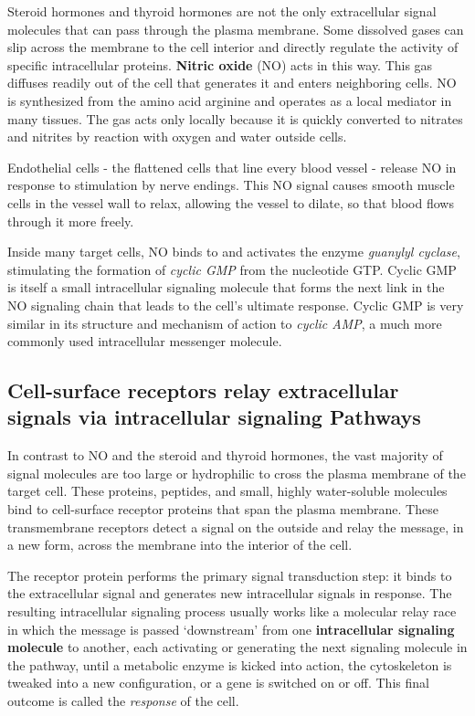Steroid hormones and thyroid hormones are not the only extracellular
signal molecules that can pass through the plasma membrane. Some
dissolved gases can slip across the membrane to the cell interior and
directly regulate the activity of specific intracellular proteins.
\textbf{Nitric oxide} (NO) acts in this way. This gas diffuses readily out of
the cell that generates it and enters neighboring cells. NO is synthesized
from the amino acid arginine and operates as a local mediator in many
tissues. The gas acts only locally because it is quickly converted to
nitrates and nitrites by reaction with oxygen and water outside cells.

Endothelial cells - the flattened cells that line every blood vessel - release
NO in response to stimulation by nerve endings. This NO signal causes
smooth muscle cells in the vessel wall to relax, allowing the vessel to
dilate, so that blood flows through it more freely.

Inside many target cells, NO binds to and activates the enzyme \textit{guanylyl
cyclase}, stimulating the formation of \textit{cyclic GMP} from the nucleotide GTP.
Cyclic GMP is itself a small intracellular signaling
molecule that forms the next link in the NO signaling chain that leads to
the cell’s ultimate response. Cyclic GMP is very similar in its structure and mechanism
of action to \textit{cyclic AMP}, a much more commonly used intracellular
messenger molecule.

\subsection{Cell-surface receptors relay extracellular signals via intracellular signaling Pathways}

In contrast to NO and the steroid and thyroid hormones, the vast majority
of signal molecules are too large or hydrophilic to cross the plasma
membrane of the target cell. These proteins, peptides, and small, highly
water-soluble molecules bind to cell-surface receptor proteins that span
the plasma membrane. These transmembrane receptors
detect a signal on the outside and relay the message, in a new form,
across the membrane into the interior of the cell.

The receptor protein performs the primary signal transduction step: it
binds to the extracellular signal and generates new intracellular signals
in response. The resulting intracellular signaling process
usually works like a molecular relay race in which the message
is passed ‘downstream’ from one \textbf{intracellular signaling molecule} to
another, each activating or generating the next signaling molecule in the
pathway, until a metabolic enzyme is kicked into action, the cytoskeleton
is tweaked into a new configuration, or a gene is switched on or off. This
final outcome is called the \textit{response} of the cell.

